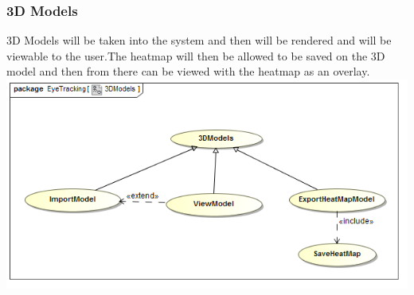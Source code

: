 	\subsubsection{3D Models}
	3D Models will be taken into the system and then will be rendered and will be viewable to the user.The heatmap will then be allowed to be saved on the 3D model and then from there can be viewed with the heatmap as an overlay.
	\newline
		\includegraphics[scale=0.5]{Diagrams/Use_Case_Diagram__3DModels.png}
